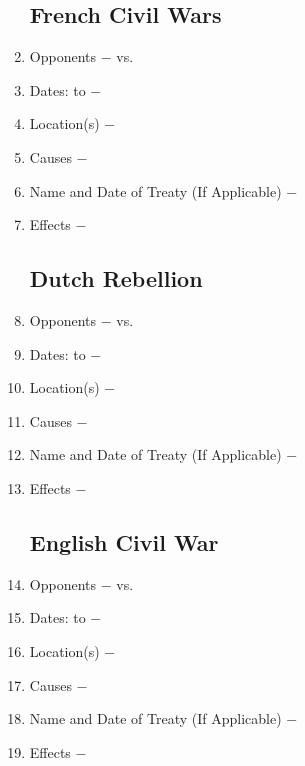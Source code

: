 \documentclass[12pt]{article}
\begin{document}
\begin{enumerate}
\subsection{French Civil Wars}
 
\item Opponents $-$ vs.

\item Dates: to $-$

\item Location(s) $-$ 

\item Causes $-$

\item Name and Date of Treaty (If Applicable) $-$ 

\item Effects $-$

\subsection{Dutch Rebellion}

\item Opponents $-$ vs.

\item Dates: to $-$

\item Location(s) $-$ 

\item Causes $-$

\item Name and Date of Treaty (If Applicable) $-$ 

\item Effects $-$ 

\subsection{English Civil War}

\item Opponents $-$ vs.

\item Dates: to $-$

\item Location(s) $-$ 

\item Causes $-$

\item Name and Date of Treaty (If Applicable) $-$ 

\item Effects $-$ 


\end{enumerate}
\end{document}
